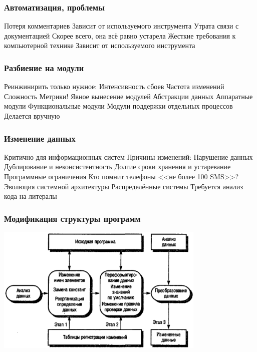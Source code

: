 \documentclass{../../slides-style}
\begin{document}
    \begin{frame}
        \frametitle{Автоматизация, проблемы}
        \begin{outline}
            \1 Потеря комментариев
                \2 Зависит от используемого инструмента
            \1 Утрата связи с документацией
                \2 Скорее всего, она всё равно устарела
            \1 Жесткие требования к компьютерной технике
                \2 Зависит от используемого инструмента
        \end{outline}
    \end{frame}

    \begin{frame}
        \frametitle{Разбиение на модули}
        \begin{outline}
            \1 Реинжинирить только нужное:
                \2 Интенсивность сбоев
                \2 Частота изменений
                \2 Сложность
                    \3 Метрики!
            \1 Явное вынесение модулей
                \2 Абстракции данных
                \2 Аппаратные модули
                \2 Функциональные модули
                \2 Модули поддержки отдельных процессов
            \1 Делается вручную
        \end{outline}
    \end{frame}

    \begin{frame}
        \frametitle{Изменение данных}
        \begin{outline}
            \1 Критично для информационных систем
            \1 Причины изменений:
                \2 Нарушение данных
                    \3 Дублирование и неконсистентность
                    \3 Долгие сроки хранения и устаревание
                \2 Программные ограничения
                    \3 Кто помнит телефоны <<не более 100 SMS>>?
                \2 Эволюция системной архитектуры
                    \3 Распределённые системы
            \1 Требуется анализ кода на литералы
        \end{outline}
    \end{frame}

    \begin{frame}
        \frametitle{Модификация структуры программ}
        \begin{center}
            \includegraphics[width=0.75\textwidth]{dataReengineering.png}
        \end{center}
    \end{frame}
\end{document}
